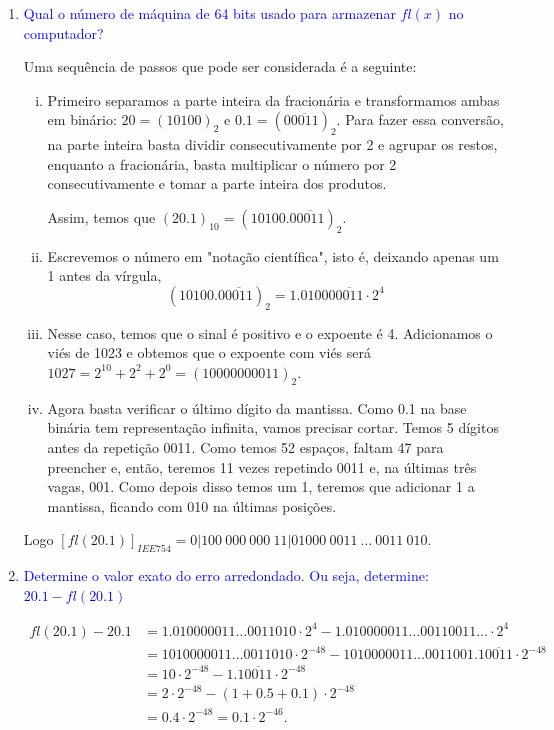 \documentclass[a4paper,12pt]{article}
\theoremstyle{exer}
\theoremstyle{definition}
\newcommand{\enu}[1]{\textcolor{blue}{#1}}
\begin{document}
\begin{enumerate}
    \item \enu{Qual o número de máquina de 64 bits usado para armazenar
    $fl(x)$ no computador? }

    Uma sequência de passos que pode ser considerada é a seguinte: 

    \begin{enumerate}[(i)]
        \item Primeiro separamos a parte inteira da fracionária e
        transformamos
        ambas em binário: $20 = (10100)_2$ e $0.1 = (0\overline{0011})_2$. Para
        fazer essa conversão, na parte inteira basta dividir consecutivamente
        por 2 e agrupar os restos, enquanto a fracionária, basta multiplicar o
        número por 2 consecutivamente e tomar a parte inteira dos produtos.

        Assim, temos que $(20.1)_{10} = (10100.0\overline{0011})_2$. 

        \item Escrevemos o número em "notação científica", isto é, deixando
        apenas um 1 antes da vírgula, 
        $$
        (10100.0\overline{0011})_2 = 1.01000\overline{0011} \cdot 2^4
        $$

        \item Nesse caso, temos que o sinal é positivo e o expoente é 4.
        Adicionamos o viés de 1023 e obtemos que o expoente com viés será $1027
        = 2^{10} + 2^2 + 2^0 = (10000000011)_2$. 
        
        \item Agora basta verificar o último dígito da mantissa. Como 0.1 na
        base binária tem representação infinita, vamos precisar cortar. Temos
        5 dígitos antes da repetição 0011. Como temos 52 espaços, faltam 47
        para preencher e, então, teremos 11 vezes repetindo 0011 e, na últimas
        três vagas, 001. Como depois disso temos um 1, teremos que adicionar 1
        a mantissa, ficando com 010 na últimas posições. 
    \end{enumerate}
 
    Logo $[fl(20.1)]_{IEE754} = 0|100~000~000~11|01000~0011~\dots~0011~010$. 

    \item \enu{Determine o valor exato do erro arredondado. Ou seja,
    determine: $20.1 - fl(20.1)$}

    \begin{equation}
        \begin{split}
            fl(20.1) - 20.1 &= 1.010000011\dots 0011010 \cdot 2^4 - 1.010000011\dots 0011 0011 \dots \cdot 2^4 \\
            &=1010000011\dots0011010\cdot 2^{-48} - 1010000011\dots 0011001.1\overline{0011}\cdot 2^{-48} \\
            &= 10\cdot 2^{-48} - 1.1\overline{0011}\cdot 2^{-48} \\
            &= 2\cdot 2^{-48} - (1 + 0.5 + 0.1)\cdot 2^{-48} \\ 
            &= 0.4\cdot 2^{-48} = 0.1\cdot 2^{-46}.
        \end{split}
    \end{equation}


\end{enumerate}
\end{document}
